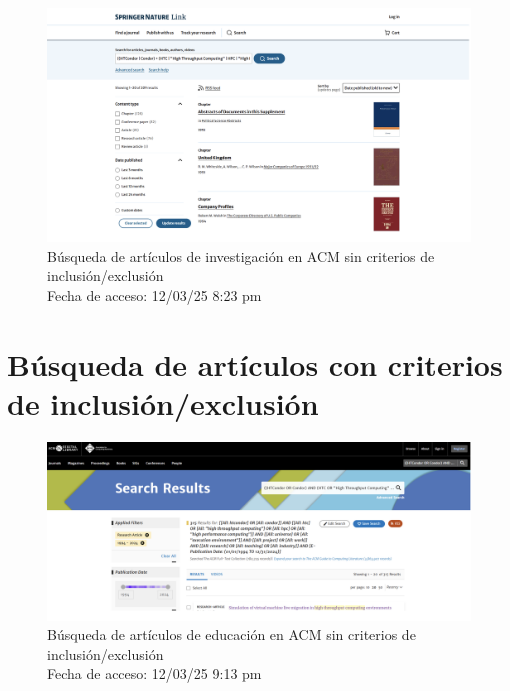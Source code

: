 \begin{figure}[H]
	\centering
	\includegraphics[width=\textwidth,keepaspectratio]{apendices/bases-datos/sin-exclusion/springer.png}
	\caption{Búsqueda de artículos de investigación en ACM sin criterios de inclusión/exclusión \\
		Fecha de acceso: 12/03/25 8:23 pm
	}\label{fig:busqueda-springer-no-exclusion}
\end{figure}




\section{Búsqueda de artículos con criterios de inclusión/exclusión}\label{sec:busqueda-con-criterios}

\begin{figure}[H]
	\centering
	\includegraphics[width=\textwidth,keepaspectratio]{apendices/bases-datos/con-exclusion/acm.png}
	\caption{Búsqueda de artículos de educación en ACM sin criterios de inclusión/exclusión \\
		Fecha de acceso: 12/03/25 9:13 pm
	}\label{fig:busqueda-acm-con-exclusion}
\end{figure}


